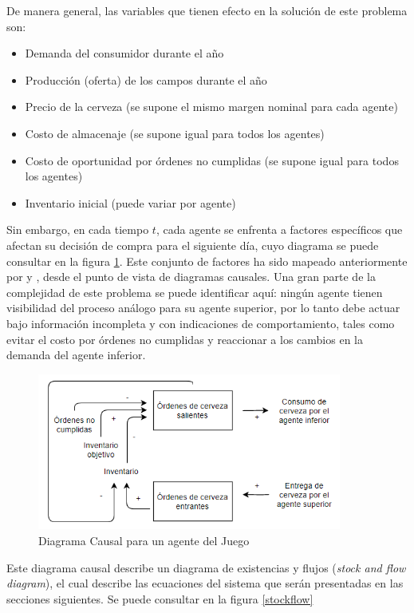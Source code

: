 De manera general, las variables que tienen efecto en la soluci\'on de este problema son:

\begin{itemize}
    \item Demanda del consumidor durante el a\~no
    \item Producci\'on (oferta) de los campos durante el a\~no
    \item Precio de la cerveza (se supone el mismo margen nominal para cada agente)
    \item Costo de almacenaje (se supone igual para todos los agentes)
    \item Costo de oportunidad por \'ordenes no cumplidas (se supone igual para todos los agentes)
    \item Inventario inicial (puede variar por agente)
\end{itemize}

Sin embargo, en cada tiempo $t$, cada agente se enfrenta a factores espec\'ificos que afectan su decisi\'on de compra para el siguiente d\'ia, cuyo diagrama se puede consultar en la figura \ref{causal}. Este conjunto de factores ha sido mapeado anteriormente por \citet{Duggan} y \citet{Grasl}, desde el punto de vista de diagramas causales. Una gran parte de la complejidad de este problema se puede identificar aqu\'i: ning\'un agente tienen visibilidad del proceso an\'alogo para su agente superior, por lo tanto debe actuar bajo informaci\'on incompleta y con indicaciones de comportamiento, tales como evitar el costo por \'ordenes no cumplidas y reaccionar a los cambios en la demanda del agente inferior.

\begin{figure}[ht]
\caption{Diagrama Causal para un agente del Juego}
\label{causal}
\includegraphics[width=10cm]{tesis_tex/figs/beer_distribution_game_causal.PNG}
\centering
\end{figure}

Este diagrama causal describe un diagrama de existencias y flujos (\textit{stock and flow diagram}), el cual describe las ecuaciones del sistema que ser\'an presentadas en las secciones siguientes. Se puede consultar en la figura \ref{stockflow}

